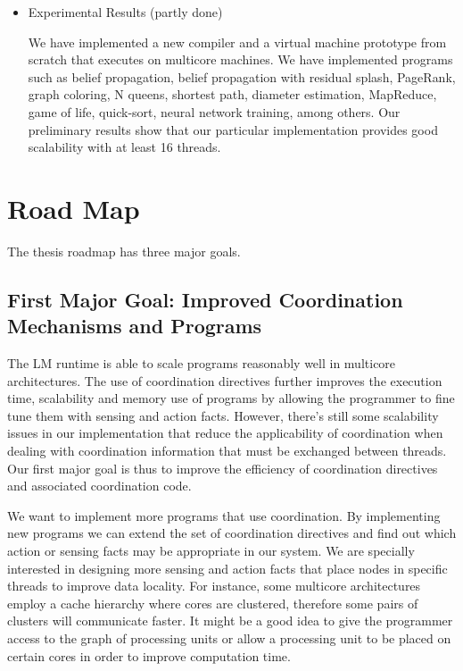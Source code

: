 \documentclass[10pt]{article}
\begin{document}
\begin{itemize}
   \item Experimental Results (partly done)

   We have implemented a new compiler and a virtual machine prototype from
   scratch that executes on multicore machines.  We have implemented programs
   such as belief propagation, belief propagation with residual splash,
   PageRank, graph coloring, N queens, shortest path, diameter estimation,
   MapReduce, game of life, quick-sort, neural network training, among others.
   Our preliminary results show that our particular implementation provides
   good scalability with at least 16 threads.
   
\end{itemize}

\section{Road Map}

The thesis roadmap has three major goals.

\subsection{First Major Goal: Improved Coordination Mechanisms and Programs}

The LM runtime is able to scale programs reasonably well in multicore
architectures. The use of coordination directives further improves the execution
time, scalability and memory use of programs by allowing the programmer to
fine tune them with sensing and action facts.
However, there's still some scalability issues in our implementation that reduce the applicability of
coordination when dealing with coordination information that must be
exchanged between threads. Our first major goal is thus to improve
the efficiency of coordination directives and associated coordination code.

We want to implement more programs that use coordination. By implementing new
programs we can extend the set of coordination directives and find out which
action or sensing facts may be appropriate in our system. We are specially
interested in designing more sensing and action facts that place nodes in
specific threads to improve data locality.  For instance, some multicore
architectures employ a cache hierarchy where cores are clustered, therefore some
pairs of clusters will communicate faster. It might be a good idea to give the
programmer access to the graph of processing units or allow a processing unit to
be placed on certain cores in order to improve computation time.
\end{document}
